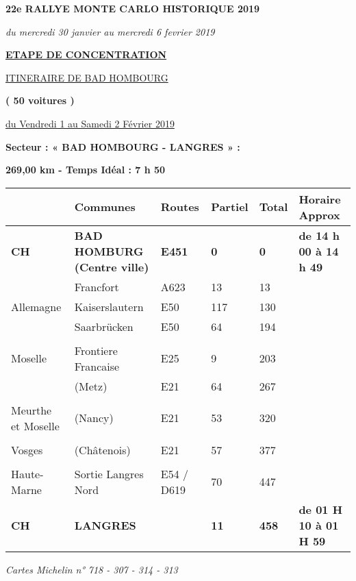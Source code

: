 \documentclass{article}%
\begin{document}
%
\normalsize%
\begin{center} \textbf{\LARGE{22e RALLYE MONTE CARLO HISTORIQUE 2019}} \end{center}%
\begin{center} \textit{du mercredi 30 janvier au mercredi 6 fevrier 2019} \end{center}%
\begin{center} \textbf{\underline{ETAPE DE CONCENTRATION}} \end{center}%
\begin{center} \underline{ITINERAIRE DE BAD HOMBOURG} \end{center}%
\begin{center} \textbf{( 50 voitures )} \end{center}%
\begin{flushright} \underline{du  Vendredi 1 au Samedi 2 Février 2019} \end{flushright}%
\begin{flushleft} \textbf{Secteur : « BAD HOMBOURG - LANGRES  » :
} \end{flushleft}%
\begin{flushright} \textbf{269,00 km - Temps Idéal : 7 h 50} \end{flushright}%
\begin{longtable}{p{2.25cm}|p{7.0cm}|p{1.5cm}|p{1.5cm}|p{1.5cm}|p{3.5cm}}%
\hline%
&Communes&Routes&Partiel&Total&Horaire Approx\\%
\hline%
\endhead%
\endfoot%
\endlastfoot%
\textbf{﻿CH}&\textbf{BAD HOMBURG                        (Centre ville)}&\textbf{E451}&\textbf{0}&\textbf{0}&\textbf{de 14 h 00 à 14 h 49}\\%
 &Francfort&A623&13&13& \\%
Allemagne&Kaiserslautern &E50 &117&130& \\%
 &Saarbrücken&E50 &64&194& \\%
\hline& & & & & \\%
Moselle&Frontiere Francaise&E25&9&203& \\%
 &(Metz)&E21 &64&267& \\%
\hline& & & & & \\%
 Meurthe et Moselle&(Nancy) &E21 &53&320& \\%
\hline& & & & & \\%
Vosges &(Châtenois)&E21 &57&377& \\%
\hline& & & & & \\%
Haute-Marne&Sortie Langres Nord&E54 / D619&70&447& \\%
\textbf{CH}&\textbf{LANGRES}& &\textbf{11}&\textbf{458}&\textbf{de 01 H 10 à 01 H 59}\\%
\hline%
\end{longtable}%
\begin{flushleft} \textit{Cartes Michelin n° 718 - 307 - 314 - 313
} \end{flushleft}%
\end{document}

